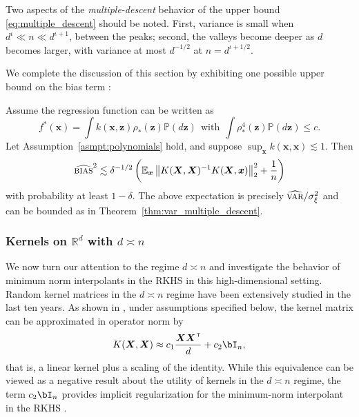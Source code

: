 Two aspects of the \emph{multiple-descent} behavior of the upper bound
\eqref{eq:multiple_descent} should be noted. First, variance is small when $d^\iota \ll n \ll d^{\iota+1}$, between the peaks; second, the valleys become deeper as $d$ becomes larger, with variance at most $d^{-1/2}$ at $n=d^{\iota+1/2}$. 

We complete the discussion of this section by exhibiting one possible upper bound on the bias term \cite{liang2020multiple}:
\begin{theorem}
	Assume the regression function can be written as
    $$f^*({\boldsymbol x})=\int
    k({\boldsymbol x},{\boldsymbol z})\rho_*({\boldsymbol z})\mathbb{P}(d{\boldsymbol z}) ~~\text{with}~~ \int
    \rho_*^4({\boldsymbol z})\mathbb{P}(d{\boldsymbol z})\leq c.$$ Let Assumption~\ref{asmpt:polynomials} hold, and suppose $\sup_{\boldsymbol x} k({\boldsymbol x},{\boldsymbol x})\lesssim 1$. Then
	\begin{align}
		{\widehat{\textsc{bias}}^2} \lesssim \delta^{-1/2} \left( \mathbb{E}_{\boldsymbol x}\left\|K({\boldsymbol X},{\boldsymbol X})^{-1}K({\boldsymbol X},{\boldsymbol x})\right\|^2_2 + \frac{1}{n}\right)
	\end{align} 
	with probability at least $1-\delta$. The above expectation is precisely ${\widehat{\textsc{var}}}/\sigma^2_\xi$ and can be bounded as in Theorem~\ref{thm:var_multiple_descent}.
\end{theorem}

\subsubsection{Kernels on ${\mathbb R}^d$ with $d\asymp n$}
\label{sec:dpropn}

We now turn our attention to the regime  $d\asymp n$ and investigate the behavior of minimum norm interpolants in the RKHS in this high-dimensional setting. Random kernel matrices in the $d\asymp n$ regime have been extensively studied in the last ten years. As shown in \cite{el2010spectrum}, under assumptions specified below, the kernel matrix can be approximated in operator norm by
$$K({\boldsymbol X},{\boldsymbol X}) \approx c_1\frac{{\boldsymbol X}{\boldsymbol X}^\ensuremath{{\scriptscriptstyle\mathsf{\,T}}}}{d} + c_2 \bI_n,$$
that is, a linear kernel plus a scaling of the identity. While this equivalence can be viewed as a negative result about the utility of kernels in the $d\asymp n$ regime, the term $c_2 \bI_n$ provides implicit regularization for the minimum-norm interpolant in the RKHS \cite{liang2020just}. 

